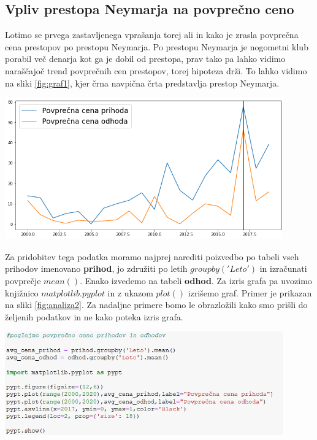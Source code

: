 \documentclass[a4paper, 12pt]{article}
\begin{document}
\subsection{Vpliv prestopa Neymarja na povprečno ceno}
Lotimo se prvega zastavljenega vprašanja torej ali in kako je zrasla povprečna cena prestopov po prestopu Neymarja. Po prestopu Neymarja je nogometni klub porabil več denarja kot ga je dobil od prestopa, prav tako pa lahko vidimo naraščajoč trend povprečnih cen prestopov, torej hipoteza drži. To lahko vidimo na sliki \ref{fig:graf1}, kjer črna navpična črta predstavlja prestop Neymarja.

\begin{center}
\includegraphics[width=0.9\textwidth]{graf1}
\label{fig:graf1}
\end{center}

Za pridobitev tega podatka moramo najprej narediti poizvedbo po tabeli vseh prihodov imenovano \textbf{prihod}, jo združiti po letih $groupby('Leto')$ in izračunati povprečje $mean()$. Enako izvedemo na tabeli \textbf{odhod}. 
Za izris grafa pa uvozimo knjižnico $matplotlib.pyplot$ in z ukazom $plot()$ izrišemo graf. Primer je prikazan na sliki \ref{fig:analiza2}. Za nadaljne primere bomo le obrazložili kako smo prišli do željenih podatkov in ne kako poteka izris grafa.

\begin{center}
\includegraphics[width=0.9\textwidth]{analiza2}
\label{fig:analiza2}
\end{center} \medskip
\end{document}

